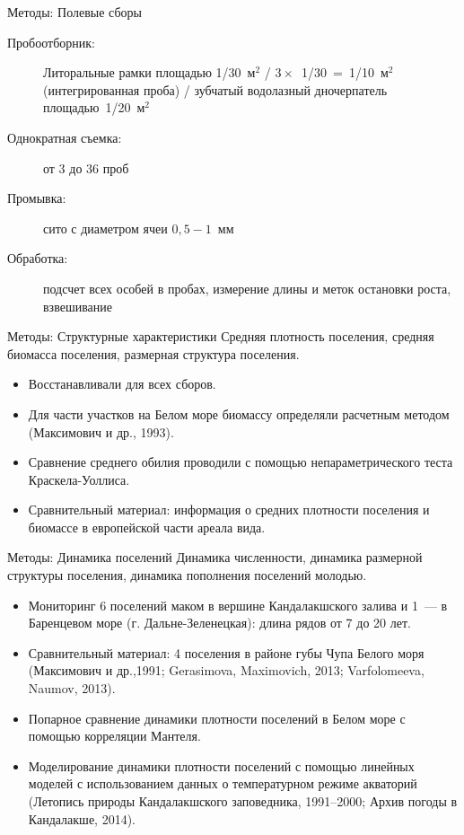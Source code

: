 \documentclass{beamer}
\begin{document}
\begin{frame}{Методы: Полевые сборы}
 \begin{description}
 		\item [Пробоотборник:] Литоральные рамки площадью 1/30~м$^2$ / $3 \times$~1/30~=~1/10~м$^2$ (интегрированная проба) / зубчатый водолазный дночерпатель площадью~1/20~м$^2$
		\item [Однократная съемка:] от 3 до 36 проб
		\item [Промывка:] сито с диаметром ячеи $0,5 - 1$~мм 
		\item [Обработка:] подсчет всех особей в пробах, измерение длины и меток остановки роста, взвешивание
	\end{description}
\end{frame}

\begin{frame}{Методы: Структурные характеристики}
Средняя плотность поселения, средняя биомасса поселения, размерная структура поселения.
	\begin{itemize}
		\item Восстанавливали для всех сборов.
		\item Для части участков на Белом море биомассу определяли расчетным методом (Максимович и др., 1993).
		\item Сравнение среднего обилия проводили с помощью непараметрического теста Краскела-Уоллиса.
		\item Сравнительный материал: информация о средних плотности поселения и биомассе в европейской части ареала вида.
	\end{itemize}
\end{frame}

\begin{frame}{Методы: Динамика поселений}
Динамика численности, динамика размерной структуры поселения, динамика пополнения поселений молодью.
	\begin{itemize}
		\item Мониторинг 6 поселений маком в вершине Кандалакшского залива и 1~--- в Баренцевом море (г. Дальне-Зеленецкая): длина рядов от 7 до 20 лет.
		\item Сравнительный материал: 4 поселения в районе губы Чупа Белого моря (Максимович и др.,1991; Gerasimova, Maximovich, 2013; Varfolomeeva, Naumov, 2013).
		\item Попарное сравнение динамики плотности поселений в Белом море с помощью корреляции Мантеля.
		\item Моделирование динамики плотности поселений с помощью линейных моделей с использованием данных о температурном режиме акваторий (Летопись природы 	Кандалакшского заповедника, 1991–2000; Архив погоды в Кандалакше, 2014).
	\end{itemize}
\end{frame}
\end{document}
